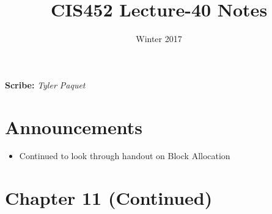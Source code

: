 \documentclass[11pt]{article}
\title{CIS452 Lecture-40 Notes}
\author{Winter 2017}
\date{}
\begin{document}
\maketitle

\noindent

\textbf{Scribe:} \textit{Tyler Paquet}

\section*{Announcements}

\begin{itemize}
  \item Continued to look through handout on Block Allocation
\end{itemize}

\section*{Chapter 11 (Continued)}

\end{document}
